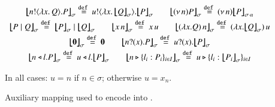 \begin{figure}[t]
\[%
	\begin{array}{c}
		\auxmapp{\bout{n}{\abs{x}{Q}} P}{{}}{\sigma} \defeq \bout{u}{\abs{x}{\auxmapp{Q}{{}}{\sigma}}} \auxmapp{P}{{}}{\sigma}
		\qquad
		\auxmapp{\news{n} P}{{}}{\sigma} \defeq \news{n} \auxmapp{P}{{}}{{\sigma \cat n}}
		\\[1mm]

		\auxmapp{P \Par Q}{{}}{\sigma} \defeq \auxmapp{P}{{}}{\sigma} \Par \auxmapp{Q}{{}}{\sigma} 
		\qquad
		\auxmapp{\appl{x}{n}}{{}}{\sigma} \defeq \appl{x}{u}
		\qquad
		\auxmapp{\appl{(\lambda x.Q)}{n}}{{}}{\sigma}  \defeq \appl{(\lambda x.\auxmapp{Q}{{}}{\sigma})}{u}
		\\[1mm]

		\auxmapp{\inact}{{}}{\sigma}  \defeq  \inact
		\qquad
		\auxmapp{\binp{n}{x} P}{{}}{\sigma} \defeq \binp{u}{x} \auxmapp{P}{{}}{\sigma} 
		\\[1mm]

		\auxmapp{\bsel{n}{l} P}{{}}{\sigma} \defeq \bsel{u}{l} \auxmapp{P}{{}}{\sigma} 
		\qquad
		\auxmapp{\bbra{n}{l_i:P_i}_{i \in I}}{{}}{\sigma} \defeq \bbra{u}{l_i:\auxmapp{P_i}{{}}{\sigma}}_{i \in I}
	\end{array}
\]
\begin{center}
	{In all cases: $u = n$ if $n\in \sigma$; otherwise $u = x_n$.}
\end{center}
\caption{\label{f:auxmap} Auxiliary mapping used to encode \HOp into \HO.}
\end{figure}

